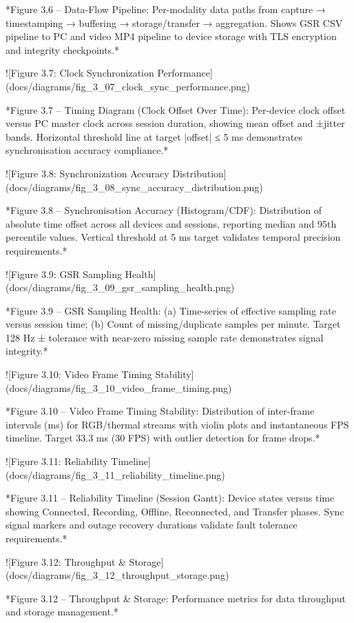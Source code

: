 \documentclass[12pt,a4paper]{article}
\begin{document}
{*Figure 3.6 – Data-Flow Pipeline: Per-modality data paths from capture → timestamping → buffering → storage/transfer → aggregation. Shows GSR CSV pipeline to PC and video MP4 pipeline to device storage with TLS encryption and integrity checkpoints.*

![Figure 3.7: Clock Synchronization Performance](docs/diagrams/fig_3_07_clock_sync_performance.png)

*Figure 3.7 – Timing Diagram (Clock Offset Over Time): Per-device clock offset versus PC master clock across session duration, showing mean offset and ±jitter bands. Horizontal threshold line at target |offset| ≤ 5 ms demonstrates synchronisation accuracy compliance.*

![Figure 3.8: Synchronization Accuracy Distribution](docs/diagrams/fig_3_08_sync_accuracy_distribution.png)

*Figure 3.8 – Synchronisation Accuracy (Histogram/CDF): Distribution of absolute time offset across all devices and sessions, reporting median and 95th percentile values. Vertical threshold at 5 ms target validates temporal precision requirements.*

![Figure 3.9: GSR Sampling Health](docs/diagrams/fig_3_09_gsr_sampling_health.png)

*Figure 3.9 – GSR Sampling Health: (a) Time-series of effective sampling rate versus session time; (b) Count of missing/duplicate samples per minute. Target 128 Hz ± tolerance with near-zero missing sample rate demonstrates signal integrity.*

![Figure 3.10: Video Frame Timing Stability](docs/diagrams/fig_3_10_video_frame_timing.png)

*Figure 3.10 – Video Frame Timing Stability: Distribution of inter-frame intervals (ms) for RGB/thermal streams with violin plots and instantaneous FPS timeline. Target 33.3 ms (30 FPS) with outlier detection for frame drops.*

![Figure 3.11: Reliability Timeline](docs/diagrams/fig_3_11_reliability_timeline.png)

*Figure 3.11 – Reliability Timeline (Session Gantt): Device states versus time showing Connected, Recording, Offline, Reconnected, and Transfer phases. Sync signal markers and outage recovery durations validate fault tolerance requirements.*

![Figure 3.12: Throughput & Storage](docs/diagrams/fig_3_12_throughput_storage.png)

*Figure 3.12 – Throughput & Storage: Performance metrics for data throughput and storage management.*

}
\end{document}
